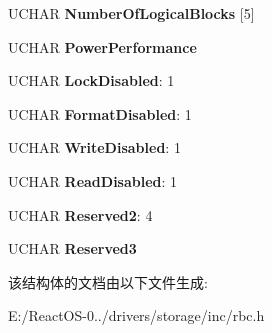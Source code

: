 \begin{DoxyCompactItemize}
U\+C\+H\+AR {\bfseries Number\+Of\+Logical\+Blocks} \mbox{[}5\mbox{]}
\item 
\mbox{\label{struct___m_o_d_e___r_b_c___d_e_v_i_c_e___p_a_r_a_m_e_t_e_r_s___p_a_g_e_a751378fc02a87e0fd452352afcdbd5df}} 
U\+C\+H\+AR {\bfseries Power\+Performance}
\item 
\mbox{\label{struct___m_o_d_e___r_b_c___d_e_v_i_c_e___p_a_r_a_m_e_t_e_r_s___p_a_g_e_acc6b55b00948947b17af57455290a50c}} 
U\+C\+H\+AR {\bfseries Lock\+Disabled}\+: 1
\item 
\mbox{\label{struct___m_o_d_e___r_b_c___d_e_v_i_c_e___p_a_r_a_m_e_t_e_r_s___p_a_g_e_a2c1db801d16a6266685db5900b0bcc34}} 
U\+C\+H\+AR {\bfseries Format\+Disabled}\+: 1
\item 
\mbox{\label{struct___m_o_d_e___r_b_c___d_e_v_i_c_e___p_a_r_a_m_e_t_e_r_s___p_a_g_e_a9a1da37bc2bd4c57d192c53879a12afe}} 
U\+C\+H\+AR {\bfseries Write\+Disabled}\+: 1
\item 
\mbox{\label{struct___m_o_d_e___r_b_c___d_e_v_i_c_e___p_a_r_a_m_e_t_e_r_s___p_a_g_e_a095c35310e0b74867dedbc93f46f7398}} 
U\+C\+H\+AR {\bfseries Read\+Disabled}\+: 1
\item 
\mbox{\label{struct___m_o_d_e___r_b_c___d_e_v_i_c_e___p_a_r_a_m_e_t_e_r_s___p_a_g_e_a016e66c253e2b8077eb2edd30dfe2ab1}} 
U\+C\+H\+AR {\bfseries Reserved2}\+: 4
\item 
\mbox{\label{struct___m_o_d_e___r_b_c___d_e_v_i_c_e___p_a_r_a_m_e_t_e_r_s___p_a_g_e_a9b488a6d2c0146119d4254c81052d947}} 
U\+C\+H\+AR {\bfseries Reserved3}
\end{DoxyCompactItemize}


该结构体的文档由以下文件生成\+:\begin{DoxyCompactItemize}
\item 
E\+:/\+React\+O\+S-\/0../drivers/storage/inc/rbc.\+h\end{DoxyCompactItemize}
